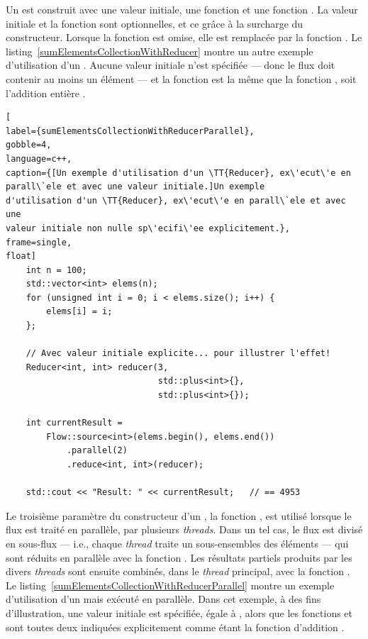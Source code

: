 Un  est construit avec une valeur initiale, une fonction  et une fonction . La valeur initiale et la fonction  sont optionnelles, et ce gr\^ace \`a la surcharge du constructeur. Lorsque la fonction  est omise, elle est remplac\'ee par la fonction . Le listing~\ref{sumElementsCollectionWithReducer} montre un autre exemple d'utilisation d'un . Aucune valeur initiale n'est sp\'ecifi\'ee --- donc le flux doit contenir au moins un \'el\'ement --- et la fonction  est la m\^eme que la fonction , soit l'addition enti\`ere . 


\begin{lstlisting}[
label={sumElementsCollectionWithReducerParallel},
gobble=4,
language=c++,
caption={[Un exemple d'utilisation d'un \TT{Reducer}, ex\'ecut\'e en
parall\`ele et avec une valeur initiale.]Un exemple
d'utilisation d'un \TT{Reducer}, ex\'ecut\'e en parall\`ele et avec une
valeur initiale non nulle sp\'ecifi\'ee explicitement.},
frame=single,
float]
    int n = 100;
    std::vector<int> elems(n);
    for (unsigned int i = 0; i < elems.size(); i++) {
        elems[i] = i;
    };

    // Avec valeur initiale explicite... pour illustrer l'effet!
    Reducer<int, int> reducer(3, 
                              std::plus<int>{}, 
                              std::plus<int>{});

	int currentResult =
		Flow::source<int>(elems.begin(), elems.end())
            .parallel(2)
            .reduce<int, int>(reducer); 
	
	std::cout << "Result: " << currentResult;	// == 4953
\end{lstlisting}


Le troisi\`eme param\`etre du constructeur d'un , la fonction , est utilis\'e lorsque le flux est trait\'e en parall\`ele, par plusieurs \emph{threads}. Dans un tel cas, le flux est divis\'e en sous-flux --- i.e., chaque \emph{thread} traite un sous-ensembles des éléments --- qui sont r\'eduits en parall\`ele avec la fonction . Les r\'esultats partiels produits par les divers \emph{threads} sont ensuite combin\'es, dans le \emph{thread} principal, avec la fonction . Le listing~\ref{sumElementsCollectionWithReducerParallel} montre un exemple d'utilisation d'un  mais ex\'ecut\'e en parall\`ele. Dans cet exemple, \`a des fins d'illustration, une valeur initiale est sp\'ecifi\'ee, \'egale \`a , alors que les fonctions  et  sont toutes deux indiqu\'ees explicitement comme \'etant la fonction d'addition . 

